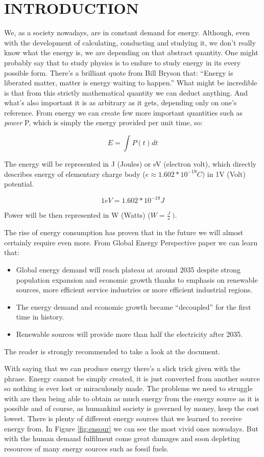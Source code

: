 \chapter{INTRODUCTION}
We, as a society nowadays, are in constant demand for energy. Although,
even with the development of calculating, conducting and studying it, we
don't really know what the energy is, we are depending on that abstract
quantity. One might probably say that to study physics is to endure to
study energy in its every possible form. There's a brilliant quote from
Bill Bryson that: ``Energy is liberated matter, matter is energy waiting
to happen.'' What might be incredible is that from this strictly
mathematical quantity we can deduct anything. And what's also important
it is as arbitrary as it gets, depending only on one's reference. From
energy we can create few more important quantities such as \emph{power}
P, which is simply the energy provided per unit time, so:

$$E = \int P\left( t \right)dt$$

\noindent The energy will be represented in J (Joules) or eV (electron
volt), which directly describes energy of elementary charge body
(\(e \approx 1.602*10^{- 19}C)\) in 1V (Volt) potential.

$$1eV = 1.602*10^{- 19}J$$

\noindent Power will be then represented in W (Watts) (\(W = \frac{J}{s}\ ).\)

\noindent The rise of energy consumption has proven that in the future we will
almost certainly require even more. From Global Energy Perspective paper 
\cite{Insights2019} we can learn that:

\begin{itemize}
\item Global energy demand will reach plateau at around 2035 despite strong population expansion and economic growth thanks to emphasis on renewable sources, more efficient service industries or more efficient industrial regions.
\item The energy demand and economic growth became ``decoupled'' for the first time in history.
\item Renewable sources will provide more than half the electricity after 2035.
\end{itemize}

\noindent The reader is strongly recommended to take a look at the document.

\noindent With saying that we can produce energy there's a slick trick given with
the phrase. Energy cannot be simply created, it is just converted from
another source so nothing is ever lost or miraculously made. The
problems we need to struggle with are then being able to obtain as much
energy from the energy source as it is possible and of course, as
humankind society is governed by money, keep the cost lowest. There is
plenty of different energy sources that we learned to receive energy
from. In Figure \ref{fig:ensour} we can see the most vivid ones nowadays. But with
the human demand fulfilment come great damages and soon depleting
resources of many energy sources such as fossil fuels.


